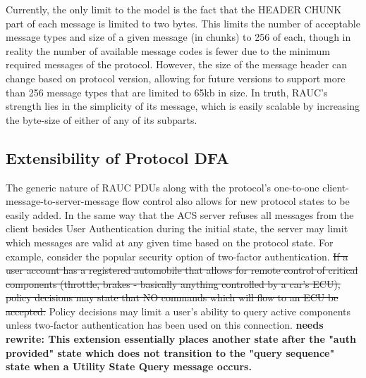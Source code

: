 \documentclass{article}
\begin{document}
Currently, the only limit to the model is the fact that the HEADER CHUNK part of each message is limited to two bytes. This limits the number of acceptable message types and size of a given message (in chunks) to 256 of each, though in reality the number of available message codes is fewer due to the minimum required messages of the protocol. However, the size of the message header can change based on protocol version, allowing for future versions to support more than 256 message types that are limited to 65kb in size. In truth,  RAUC's strength lies in the simplicity of its message, which is easily scalable by increasing the byte-size of either of any of its subparts. 

\subsection{Extensibility of Protocol DFA}
The generic nature of RAUC PDUs along with the protocol's one-to-one client-message-to-server-message flow control also allows for new protocol states to be easily added. In the same way that the ACS server refuses all messages from the client besides User Authentication during the initial state, the server may limit which messages are valid at any given time based on the protocol state. For example, consider the popular security option of two-factor authentication. \sout{If a user account has a registered automobile that allows for remote control of critical components (throttle, brakes - basically anything controlled by a car's ECU), policy decisions may state that NO commands which will flow to an ECU be accepted.} Policy decisions may limit a user's ability to query active components unless two-factor authentication has been used on this connection. \textbf{needs rewrite: This extension essentially places another state after the "auth provided" state which does not transition to the "query sequence" state when a Utility State Query message occurs.}
\end{document}
